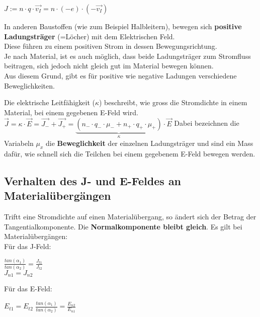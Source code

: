 					\begin{center}
						$\displaystyle J := n \cdot q \cdot \vec{v_I} = n \cdot (-e) \cdot (-\vec{v_I}) $
					\end{center}

					In anderen Baustoffen (wie zum Beispiel Halbleitern), bewegen sich \textbf{positive Ladungsträger} (=Löcher) mit dem Elektrischen Feld. \\
					Diese führen zu einem positiven Strom in dessen Bewegungsrichtung. \\
					Je nach Material, ist es auch möglich, dass beide Ladungsträger zum Stromfluss beitragen, sich jedoch nicht gleich gut im Material bewegen können. \\
					Aus diesem Grund, gibt es für positive wie negative Ladungen verschiedene Beweglichkeiten.

					\beginip
					Die elektrische Leitfähigkeit ($\kappa$) beschreibt, wie gross die Stromdichte in einem Material, bei einem gegebenen E-Feld wird. \\
					\formulaBegin
					$\displaystyle \vec{J} = \kappa \cdot \vec{E} = \vec{J_{-}} + \vec{J_{+}} = \underbrace{(n_{-} \cdot q_{-} \cdot \mu_- + n_+ \cdot q_+ \cdot \mu_{+})}_{\kappa} \cdot \vec{E}$
					\formulaEnd
					Dabei bezeichnen die Variabeln $\mu_{x}$ die \textbf{Beweglichkeit} der einzelnen Ladungsträger und sind ein Mass dafür, wie schnell sich die Teilchen bei einem gegebenem E-Feld bewegen werden.
					\iend


					\subsection{Verhalten des J- und E-Feldes an Materialübergängen}
					Triftt eine Stromdichte auf einen Materialübergang, so ändert sich der Betrag der Tangentialkomponente. Die \textbf{Normalkomponente bleibt gleich}.
					\begingl
					Es gilt bei Materialübergängen: \\
					Für das J-Feld:
					\fspace
					\formulaBegin

					$\displaystyle \frac{tan(\alpha_1)}{tan(\alpha_2)} = \frac{J_{t1}}{J_{t2}}  $ \\
					\fspace
					$\displaystyle J_{n1} = J_{n2}$

					\formulaEnd

					Für das E-Feld:
					\fspace
					\formulaBegin

					$\displaystyle E_{t1} = E_{t2}$
										$\displaystyle \frac{tan(\alpha_1)}{tan(\alpha_2)} = \frac{E_{n2}}{E_{n1}}  $ \\
										\fspace

					\formulaEnd
					\iend
